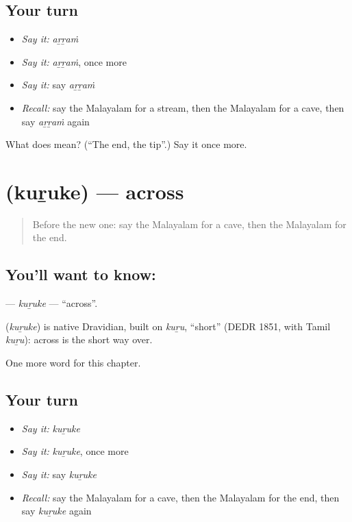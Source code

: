 \subsection*{Your turn}
\begin{itemize}
\raggedright
  \item \emph{Say it:} \emph{aṟṟaṁ}
  \item \emph{Say it:} \emph{aṟṟaṁ}, once more
  \item \emph{Say it:} say \emph{aṟṟaṁ}
  \item \emph{Recall:} say the Malayalam for a stream, then the Malayalam for a cave, then say \emph{aṟṟaṁ} again
\end{itemize}

\begin{tcolorbox}[breakable,colback=teal!4,colframe=teal!35!black,title={Before you move on}]
What does  mean? (\textquotedblleft{}The end, the tip\textquotedblright{}.) Say it once more.
\end{tcolorbox}
\section[\texorpdfstring{\ml{കുറുകെ} (kuṟuke)}{കുറുകെ (kuṟuke)}]{ (kuṟuke) — across}

\label{lesson:ML-C240-kuruke}



\begin{quote}
Before the new one: say the Malayalam for a cave, then the Malayalam for the end.
\end{quote}

\subsection*{You'll want to know: }
\textbf{} — \emph{kuṟuke} — \textquotedblleft{}across\textquotedblright{}.

\begin{cousinweb}
\textbf{} (\emph{kuṟuke}) is native Dravidian, built on \emph{kuṟu}, \textquotedblleft{}short\textquotedblright{} (DEDR 1851, with Tamil \emph{kuṟu}): across is the short way over.
\end{cousinweb}

\begin{grammarlens}[title={What you've built}]
One more word for this chapter.
\end{grammarlens}

\subsection*{Your turn}
\begin{itemize}
\raggedright
  \item \emph{Say it:} \emph{kuṟuke}
  \item \emph{Say it:} \emph{kuṟuke}, once more
  \item \emph{Say it:} say \emph{kuṟuke}
  \item \emph{Recall:} say the Malayalam for a cave, then the Malayalam for the end, then say \emph{kuṟuke} again
\end{itemize}

